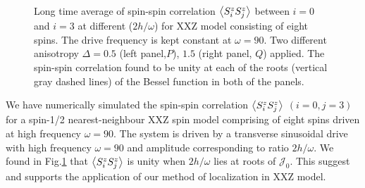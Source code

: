 \documentclass[aps,prb,reprint,showpacs,floatfix,superscriptaddress, onecolumn, nofootinbib, 9pt]{revtex4-2}
\begin{document}
\begin{enumerate}
{\begin{figure}[t]
	\caption{Long time average of spin-spin correlation $\expval{S^z_i S^z_{j}}$ between $i=0$ and $i=3$ at different ($2h/\omega$) for XXZ model consisting of eight spins. The drive frequency is kept constant at $\omega = 90$. Two different anisotropy $\Delta = 0.5$ (left panel,$P$), $1.5$ (right panel, $Q$) applied. The spin-spin correlation found to be unity at each of the roots (vertical gray dashed lines) of the Bessel function in both of the panels.}
	\label{fig:std_Ns}
\end{figure}
We have numerically simulated the spin-spin correlation $\expval{S^z_i S^z_j}$ $(i=0,j=3)$ for a spin-1/2 nearest-neighbour XXZ spin model comprising of eight spins driven at high frequency $\omega=90$. The system is driven by a transverse sinusoidal drive with high frequency $\omega =90$ and amplitude corresponding to ratio $2h/\omega$. We found in Fig.\ref{fig:std_Ns} that $\expval{S^z_i S^z_j}$ is unity when $2h/\omega$ lies at roots of $\mathcal{J}_0$. This suggest  and supports the application of our method of localization in XXZ model.

}
\end{enumerate}
\end{document}

